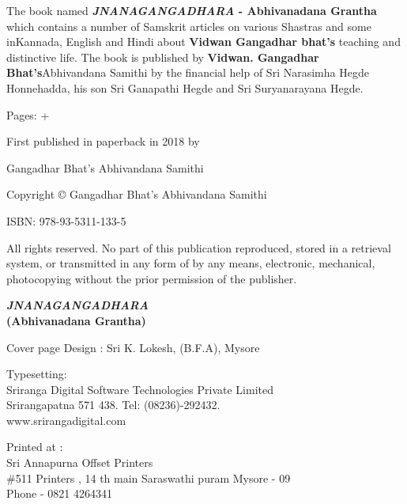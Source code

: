 \thispagestyle{empty}
{\fontsize{10}{12}\selectfont

The book named \textbf{\emph{JNANAGANGADHARA }- Abhivanadana Grantha} which contains a number of Samskrit articles on various Shastras and some in\break Kannada, English and Hindi about \textbf{Vidwan Gangadhar bhat’s} teaching and  distinctive life. The book is published by \textbf{Vidwan. Gangadhar Bhat’s}\break Abhivandana Samithi by the financial help of Sri Narasimha Hegde Honnehadda, his son Sri Ganapathi Hegde and Sri Suryanarayana Hegde.

\begin{flushleft}

\bigskip
Pages: \pageref{prelims_pages} + \pageref{bookend}

First published in paperback in 2018 by

Gangadhar Bhat’s Abhivandana Samithi

Copyright © Gangadhar Bhat’s Abhivandana Samithi

\bigskip
ISBN: 978-93-5311-133-5

\bigskip
All rights reserved. No part of this publication reproduced, stored in a retrieval system, or transmitted in any form of by any means, electronic, mechanical, photocopying without the prior permission of the publisher.
\vfill
\begin{center}
\textbf{{\Large \emph{JNANAGANGADHARA}}\\
(Abhivanadana Grantha)}
\end{center}
\vfill
 
\bigskip
Cover page Design : Sri K. Lokesh, (B.F.A), Mysore

\bigskip
\noindent
Typesetting:\\ 
{\selectfont Sriranga Digital Software Technologies Private Limited}\\ 
Srirangapatna 571 438. Tel: (08236)-292432.\\
www.srirangadigital.com
\vfill

\bigskip
Printed at :\\
Sri Annapurna Offset Printers\\
\#511 Printers , 14 th main Saraswathi puram Mysore - 09\\
Phone - 0821 4264341

\end{flushleft}

}
